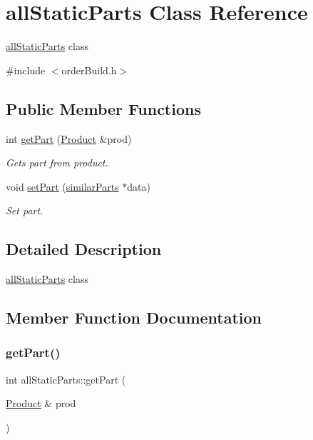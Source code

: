 \hypertarget{classallStaticParts}{}\section{all\+Static\+Parts Class Reference}
\label{classallStaticParts}


\hyperlink{classallStaticParts}{all\+Static\+Parts} class  




{\ttfamily \#include $<$order\+Build.\+h$>$}

\subsection*{Public Member Functions}
\begin{DoxyCompactItemize}
\item 
int \hyperlink{classallStaticParts_afcf48c7e1aacab3554bdc767e536d02b}{get\+Part} (\hyperlink{structProduct}{Product} \&prod)
\begin{DoxyCompactList}\small\item\em Gets part from product. \end{DoxyCompactList}\item 
void \hyperlink{classallStaticParts_aaf0ad01ce61050e4f1f91cd25ef13dc8}{set\+Part} (\hyperlink{structsimilarParts}{similar\+Parts} $\ast$data)
\begin{DoxyCompactList}\small\item\em Set part. \end{DoxyCompactList}\end{DoxyCompactItemize}


\subsection{Detailed Description}
\hyperlink{classallStaticParts}{all\+Static\+Parts} class 

\subsection{Member Function Documentation}
\mbox{\label{classallStaticParts_afcf48c7e1aacab3554bdc767e536d02b}} 
\subsubsection{\texorpdfstring{get\+Part()}{getPart()}}
{\footnotesize\ttfamily int all\+Static\+Parts\+::get\+Part (\begin{DoxyParamCaption}\item[{\hyperlink{structProduct}{Product} \&}]{prod }\end{DoxyParamCaption})}



